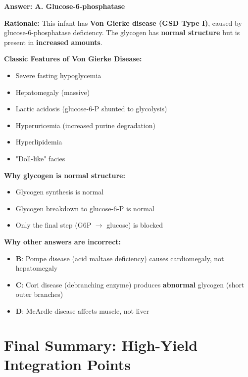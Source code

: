 \begin{solution}
\textbf{Answer: A. Glucose-6-phosphatase}

\textbf{Rationale:} This infant has \textbf{Von Gierke disease (GSD Type I)}, caused by glucose-6-phosphatase deficiency. The glycogen has \textbf{normal structure} but is present in \textbf{increased amounts}.

\textbf{Classic Features of Von Gierke Disease:}
\begin{itemize}
    \item Severe fasting hypoglycemia
    \item Hepatomegaly (massive)
    \item Lactic acidosis (glucose-6-P shunted to glycolysis)
    \item Hyperuricemia (increased purine degradation)
    \item Hyperlipidemia
    \item "Doll-like" facies
\end{itemize}

\textbf{Why glycogen is normal structure:}
\begin{itemize}
    \item Glycogen synthesis is normal
    \item Glycogen breakdown to glucose-6-P is normal
    \item Only the final step (G6P $\rightarrow$ glucose) is blocked
\end{itemize}

\textbf{Why other answers are incorrect:}
\begin{itemize}
    \item \textbf{B}: Pompe disease (acid maltase deficiency) causes cardiomegaly, not hepatomegaly
    \item \textbf{C}: Cori disease (debranching enzyme) produces \textbf{abnormal} glycogen (short outer branches)
    \item \textbf{D}: McArdle disease affects muscle, not liver
\end{itemize}
\end{solution}


\section{Final Summary: High-Yield Integration Points}

